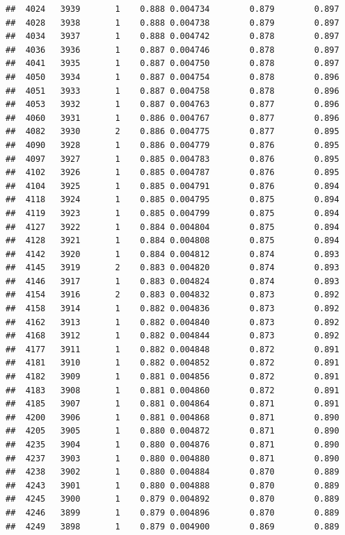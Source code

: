 \documentclass[
]{book}
\begin{document}
\begin{verbatim}
##  4024   3939       1    0.888 0.004734        0.879        0.897
##  4028   3938       1    0.888 0.004738        0.879        0.897
##  4034   3937       1    0.888 0.004742        0.878        0.897
##  4036   3936       1    0.887 0.004746        0.878        0.897
##  4041   3935       1    0.887 0.004750        0.878        0.897
##  4050   3934       1    0.887 0.004754        0.878        0.896
##  4051   3933       1    0.887 0.004758        0.878        0.896
##  4053   3932       1    0.887 0.004763        0.877        0.896
##  4060   3931       1    0.886 0.004767        0.877        0.896
##  4082   3930       2    0.886 0.004775        0.877        0.895
##  4090   3928       1    0.886 0.004779        0.876        0.895
##  4097   3927       1    0.885 0.004783        0.876        0.895
##  4102   3926       1    0.885 0.004787        0.876        0.895
##  4104   3925       1    0.885 0.004791        0.876        0.894
##  4118   3924       1    0.885 0.004795        0.875        0.894
##  4119   3923       1    0.885 0.004799        0.875        0.894
##  4127   3922       1    0.884 0.004804        0.875        0.894
##  4128   3921       1    0.884 0.004808        0.875        0.894
##  4142   3920       1    0.884 0.004812        0.874        0.893
##  4145   3919       2    0.883 0.004820        0.874        0.893
##  4146   3917       1    0.883 0.004824        0.874        0.893
##  4154   3916       2    0.883 0.004832        0.873        0.892
##  4158   3914       1    0.882 0.004836        0.873        0.892
##  4162   3913       1    0.882 0.004840        0.873        0.892
##  4168   3912       1    0.882 0.004844        0.873        0.892
##  4177   3911       1    0.882 0.004848        0.872        0.891
##  4181   3910       1    0.882 0.004852        0.872        0.891
##  4182   3909       1    0.881 0.004856        0.872        0.891
##  4183   3908       1    0.881 0.004860        0.872        0.891
##  4185   3907       1    0.881 0.004864        0.871        0.891
##  4200   3906       1    0.881 0.004868        0.871        0.890
##  4205   3905       1    0.880 0.004872        0.871        0.890
##  4235   3904       1    0.880 0.004876        0.871        0.890
##  4237   3903       1    0.880 0.004880        0.871        0.890
##  4238   3902       1    0.880 0.004884        0.870        0.889
##  4243   3901       1    0.880 0.004888        0.870        0.889
##  4245   3900       1    0.879 0.004892        0.870        0.889
##  4246   3899       1    0.879 0.004896        0.870        0.889
##  4249   3898       1    0.879 0.004900        0.869        0.889

\end{verbatim}
\end{document}
